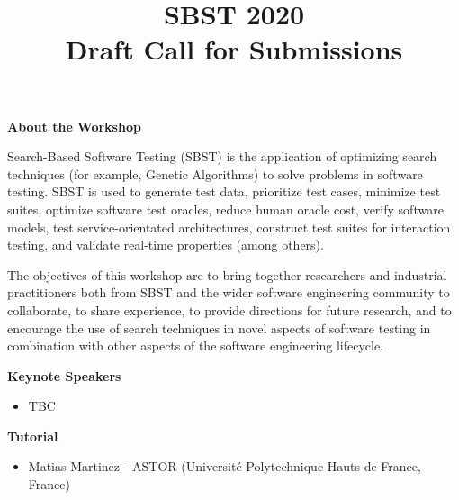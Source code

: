\documentclass[10pt,conference]{IEEEtran}
\title{SBST 2020\\Draft Call for Submissions}
\begin{document}
\maketitle






\noindent\textbf{About the Workshop}



\smallskip\noindent Search-Based Software Testing (SBST) is the
application of optimizing search techniques (for example, Genetic
Algorithms) to solve problems in software testing. SBST is used to
generate test data, prioritize test cases, minimize test suites,
optimize software test oracles, reduce human oracle cost, verify
software models, test service-orientated architectures, construct test
suites for interaction testing, and validate real-time properties
(among others).

\smallskip\noindent The objectives of this workshop are to bring
together researchers and industrial practitioners both from SBST and
the wider software engineering community to collaborate, to share
experience, to provide directions for future research, and to
encourage the use of search techniques in novel aspects of software
testing in combination with other aspects of the software engineering
lifecycle.





\smallskip\noindent\textbf{Keynote Speakers}
\begin{itemize}
\setlength{\itemsep}{1pt}
  \setlength{\parskip}{0pt}
  \setlength{\parsep}{0pt}
\item{TBC}
\end{itemize}

\smallskip\noindent\textbf{Tutorial}
\begin{itemize}
\setlength{\itemsep}{1pt}
  \setlength{\parskip}{0pt}
  \setlength{\parsep}{0pt}
\item{Matias Martinez - ASTOR\newline
(Universit{\'e} Polytechnique Hauts-de-France, France)}
\end{itemize}
\end{document}
